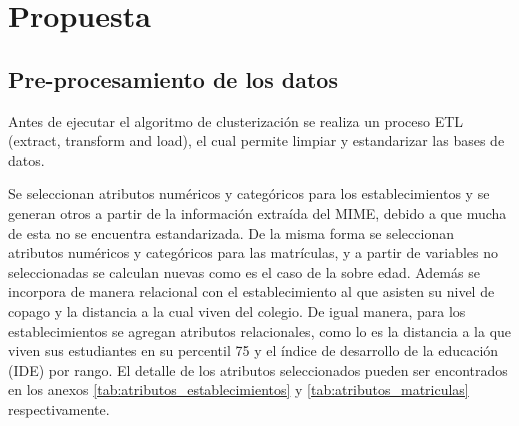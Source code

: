 \chapter{Propuesta}

\section{Pre-procesamiento de los datos}

Antes de ejecutar el algoritmo de clusterización se realiza un proceso ETL (extract, transform and load), el cual permite limpiar y estandarizar las bases de datos.

Se seleccionan atributos numéricos y categóricos para los establecimientos y se generan otros a partir de la información extraída del MIME\cite{MIME}, debido a que mucha de esta no se encuentra estandarizada. De la misma forma se seleccionan atributos numéricos y categóricos para las matrículas, y a partir de variables no seleccionadas se calculan nuevas como es el caso de la sobre edad. Además se incorpora de manera relacional con el establecimiento al que asisten su nivel de copago y la distancia a la cual viven del colegio. De igual manera, para los establecimientos se agregan atributos relacionales, como lo es la distancia a la que viven sus estudiantes en su percentil 75 y el índice de desarrollo de la educación (IDE) por rango. El detalle de los atributos seleccionados pueden ser encontrados en los anexos \ref{tab:atributos_establecimientos} y \ref{tab:atributos_matriculas} respectivamente.

